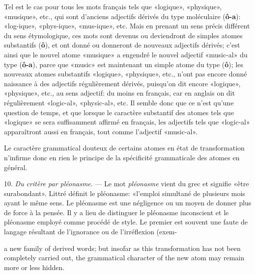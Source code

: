 \begin{sloppypar}
{{      Tel est le cas pour tous les mots français tels que «logique»,
      «physique», «musique», etc., qui sont d’anciens adjectifs
      dérivés du type moléculaire (\textbf{ô-a}): «log-ique»,
      «phys-ique», «mus-ique», etc. Mais en prenant un sens précis
      différent du sens étymologique, ces mots sont devenus ou
      deviendront de simples atomes substantifs (\textbf{ô}), et ont
      donné ou donneront de nouveaux adjectifs dérivés; c’est ainsi
      que le nouvel atome «musique» a engendré le nouvel adjectif
      «music-al» du type (\textbf{ô-a}), parce que «music» est
      maintenant un simple atome du type (\textbf{ô}); les nouveaux
      atomes substantifs «logique», «physique», etc., n’ont pas encore
      donné naissance à des adjectifs régulièrement dérivés, puisqu’on
      dit encore «logique», «physique», etc., au sens adjectif: du
      moins en français, car en anglais on dit régulièrement
      «logic-al», «physic-al», etc. Il semble donc que ce n’est qu’une
      question de temps, et que lorsque le caractère substantif des
      atomes tels que «logique» se sera suffisamment affirmé en
      français, les adjectifs tels que «logic-al» apparaîtront aussi
      en français, tout comme l’adjectif «music-al».

      Le caractère grammatical douteux de certains atomes en état de
      transformation n’infirme donc en rien le principe de la
      spécificité grammaticale des atomes en général.

      10. \emph{Du critère par pléonasme}. — Le mot \emph{pléonasme}
      vient du grec et signifie «être surabondant». Littré définit le
      pléonasme: «l'emploi simultané de plusieurs mois ayant le même
      sens. Le pléonasme est une négligence ou un moyen de donner plus
      de force à la pensée. Il y a lieu de distinguer le pléonasme
      inconscient et le pléonasme employé comme procédé de style. Le
      premier est souvent une faute de langage résultant de
      l'ignorance ou de l’irréflexion (exem-%

    } }
%
  {\noindent
    {\small a new family of derived words; but insofar as this
      transformation has not been completely carried out, the
      grammatical character of the new atom may remain more or less
      hidden.

}}
\end{sloppypar}
